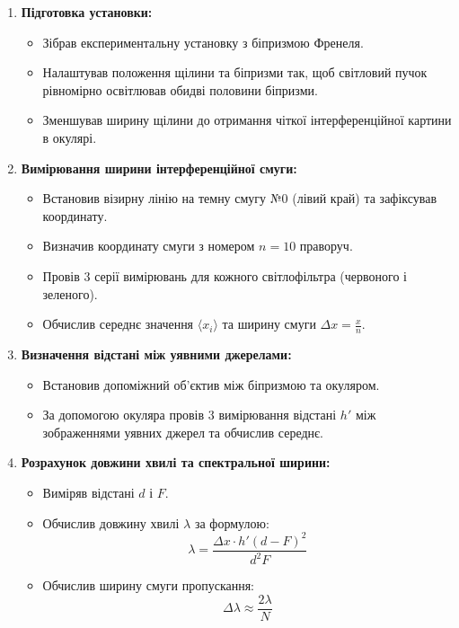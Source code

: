\documentclass[12pt,a4paper]{article}
\begin{document}
    \begin{enumerate}
        \item \textbf{Підготовка установки:}
        \begin{itemize}
          \item Зібрав експериментальну установку з біпризмою Френеля.
          \item Налаштував положення щілини та біпризми так, щоб світловий пучок рівномірно освітлював обидві половини біпризми.
          \item Зменшував ширину щілини до отримання чіткої інтерференційної картини в окулярі.
        \end{itemize}
      
        \item \textbf{Вимірювання ширини інтерференційної смуги:}
        \begin{itemize}
          \item Встановив візирну лінію на темну смугу №0 (лівий край) та зафіксував координату.
          \item Визначив координату смуги з номером $n = 10$ праворуч.
          \item Провів 3 серії вимірювань для кожного світлофільтра (червоного і зеленого).
          \item Обчислив середнє значення $\langle x_i \rangle$ та ширину смуги $\displaystyle \Delta x = \frac{x}{n}$.
        \end{itemize}
      
        \item \textbf{Визначення відстані між уявними джерелами:}
        \begin{itemize}
          \item Встановив допоміжний об’єктив між біпризмою та окуляром.
          \item За допомогою окуляра провів 3 вимірювання відстані $h'$ між зображеннями уявних джерел та обчислив середнє.
        \end{itemize}
      
        \item \textbf{Розрахунок довжини хвилі та спектральної ширини:}
        \begin{itemize}
          \item Виміряв відстані $d$ і $F$.
          \item Обчислив довжину хвилі $\lambda$ за формулою:
          \[
          \lambda = \frac{\Delta x \cdot h' (d - F)^2}{d^2 F}
          \]
          \item Обчислив ширину смуги пропускання:
          \[
          \Delta \lambda \approx \frac{2\lambda}{N}
          \]
        \end{itemize}
      

\end{enumerate}
\end{document}
